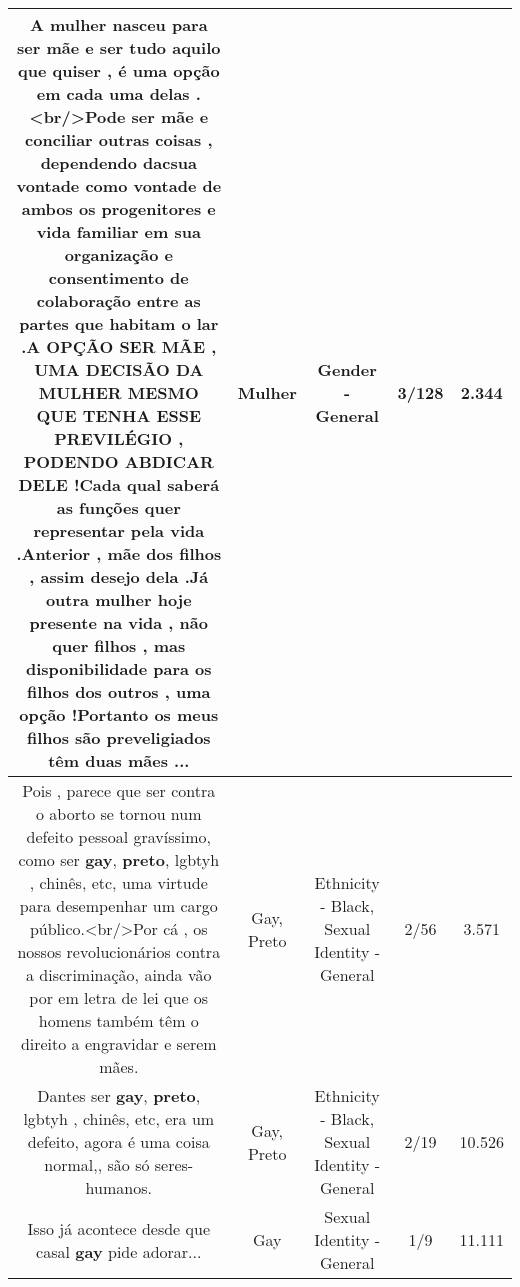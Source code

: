 \documentclass[11pt]{article}
\newlength\mylength
\begin{document}
\begin{center}
\begin{longtable}{|C{.65\mylength}|C{.30\mylength}|C{.12\mylength}|C{.12\mylength}|C{.12\mylength}|}
  \small A \textbf{mulher} nasceu para ser mãe e ser tudo aquilo que quiser , é uma opção em cada uma delas . <br/>Pode ser  mãe e conciliar outras coisas , dependendo dacsua vontade como vontade de ambos os progenitores e vida familiar em sua organização e consentimento de colaboração entre as partes que habitam o lar .A OPÇÃO SER MÃE , UMA DECISÃO DA \textbf{MULHER} MESMO QUE TENHA ESSE PREVILÉGIO , PODENDO ABDICAR DELE !Cada qual saberá as funções quer representar pela vida .Anterior , mãe dos filhos , assim desejo dela .Já outra \textbf{mulher} hoje presente na vida , não quer filhos , mas disponibilidade para os filhos dos outros , uma opção !Portanto os meus filhos são preveligiados têm duas mães ...\normalsize   & Mulher & Gender - General & 3/128 & 2.344 \\  \hline
  \small Pois , parece que ser contra o aborto se tornou num defeito pessoal gravíssimo, como ser \textbf{gay}, \textbf{preto}, lgbtyh , chinês, etc, uma virtude para desempenhar um cargo público.<br/>Por cá , os nossos revolucionários contra a discriminação, ainda vão por em letra de lei que os homens também têm o direito a engravidar e serem mães.\normalsize   & Gay, Preto & Ethnicity - Black, Sexual Identity - General & 2/56 & 3.571 \\  \hline
  \small Dantes ser \textbf{gay}, \textbf{preto}, lgbtyh , chinês, etc, era um defeito, agora é uma coisa normal,, são só seres-humanos.\normalsize   & Gay, Preto & Ethnicity - Black, Sexual Identity - General & 2/19 & 10.526 \\  \hline
  \small Isso já acontece desde que casal \textbf{gay} pide adorar...\normalsize   & Gay & Sexual Identity - General & 1/9 & 11.111 \\  \hline
  
\end{longtable}
\end{center}
\end{document}
